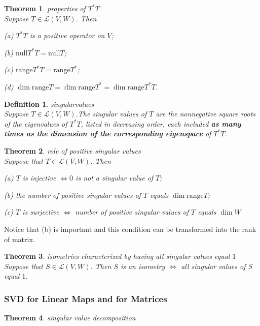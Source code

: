 \documentclass{article}
\newtheorem{theorem}{Theorem}[subsection]
\newtheorem{definition}{Definition}[subsection]
\newcommand{\range}{\text{range}}
\newcommand{\n}{\text{null}}
\begin{document}
\begin{CJK}{UTF8}{gkai}
\begin{theorem}
    properties of $T^\ast T$\\

    Suppose $T \in \mathcal{L}(V,W)$. Then

    (a) $T^\ast T$ is a positive operator on $V$;

    (b) $\n T^\ast T = \n T$;

    (c) $\range T^\ast T = \range T^\ast$;

    (d) $\dim \range T = \dim \range T^\ast  = \dim \range T^\ast T$.
\end{theorem}

\begin{definition}
    singularvalues\\

    Suppose $T\in\mathcal{L}(V,W)$.The singular values of $T$ are the nonnegative square roots of the eigenvalues of $T^\ast T$, listed in decreasing order, each included \textbf{as many times as the dimension of the corresponding eigenspace} of $T^\ast T$.
\end{definition}

\begin{theorem}
    role of positive singular values\\

    Suppose that $T \in \mathcal{L}(V,W)$. Then

    (a) $T$ is injective $\Leftrightarrow 0$ is not a singular value of $T$;

    (b) the number of positive singular values of $T$ equals $\dim \range T$;

    (c) $T$ is surjective $\Leftrightarrow$ number of positive singular values of $T$ equals $\dim W$
\end{theorem}

Notice that (b) is important and this condition can be transformed into the rank of matrix.

\begin{theorem}
    isometries characterized by having all singular values equal $1$\\

    Suppose that $S \in \mathcal{L}(V,W)$. Then $S$ is an isometry $\Leftrightarrow$ all singular values of S equal $1$.
\end{theorem}

\subsubsection{SVD for Linear Maps and for Matrices}
\begin{theorem}
    singular value decomposition\\


\end{theorem}
\end{CJK}
\end{document}
